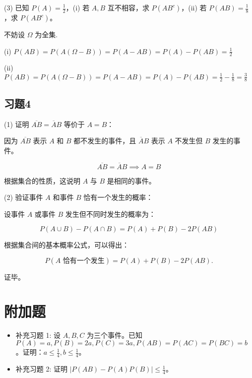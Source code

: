 \documentclass[twoside]{article}
\begin{document}
(3) 已知 $P(A) = \frac{1}{2}$，(i) 若 $A, B$ 互不相容，求 $P(AB^c)$，(ii) 若 $P(AB) = \frac{1}{8}$，求 $P(AB^c)$。

\begin{ans}{7}{7}
不妨设 $ \Omega $ 为全集.

(i) $ P(AB) = P(A(\Omega - B)) = P(A - AB) = P(A) - P(AB) = \frac{1}{2} $

(ii)$ P(AB) = P(A(\Omega - B)) = P(A - AB) = P(A) - P(AB) = \frac{1}{2} - \frac{1}{8} = \frac{3}{8} $

\end{ans}

\subsection{习题4}

(1) 证明 $\overline{AB} = \overline{A}B$ 等价于 $A = B$：
\begin{ans}{8}{8}
    因为 $\overline{AB}$ 表示 $A$ 和 $B$ 都不发生的事件，且 $\overline{A}B$ 表示 $A$ 不发生但 $B$ 发生的事件。
    
    \[
    \overline{AB} = \overline{A}B \implies A = B
    \]
    
    根据集合的性质，这说明 $A$ 与 $B$ 是相同的事件。
\end{ans}

(2) 验证事件 $A$ 和事件 $B$ 恰有一个发生的概率：

\begin{ans}{9}{9}
    
    设事件 $A$ 或事件 $B$ 发生但不同时发生的概率为：
    
    \[
    P(A \cup B) - P(A \cap B) = P(A) + P(B) - 2P(AB)
    \]
    
    根据集合间的基本概率公式，可以得出：
    
    \[
    P(A \text{ 恰有一个发生}) = P(A) + P(B) - 2P(AB).
    \]
    
    证毕。
\end{ans}

\section{附加题}

\begin{itemize}
    \item 补充习题 1: 设 $A, B, C$ 为三个事件。已知 $P(A) = a, P(B) = 2a, P(C) = 3a, P(AB) = P(AC) = P(BC) = b$。证明：$a \leq \frac{1}{4}, b \leq \frac{1}{4}$。
    
    \item 补充习题 2: 证明 $\lvert P(AB) - P(A)P(B) \rvert \leq \frac{1}{4}$。
\end{itemize}
\end{document}

